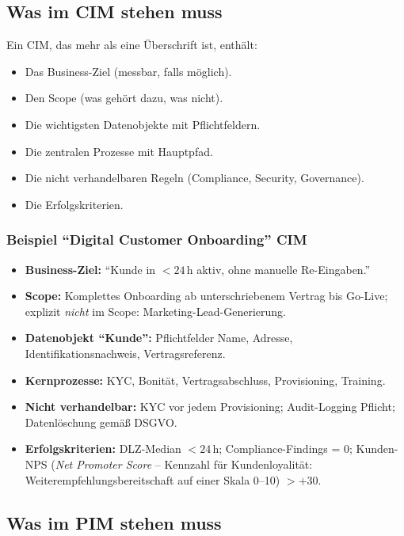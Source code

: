 \documentclass[11pt,a4paper,oneside]{article}
\begin{document}
\medskip

\subsection{Was im CIM stehen muss}

Ein CIM, das mehr als eine Überschrift ist, enthält:

\begin{itemize}
  \item Das Business-Ziel (messbar, falls möglich).
  \item Den Scope (was gehört dazu, was nicht).
  \item Die wichtigsten Datenobjekte mit Pflichtfeldern.
  \item Die zentralen Prozesse mit Hauptpfad.
  \item Die nicht verhandelbaren Regeln (Compliance, Security, Governance).
  \item Die Erfolgskriterien.
\end{itemize}

\subsubsection{Beispiel ``Digital Customer Onboarding'' CIM}

\begin{itemize}
  \item \textbf{Business-Ziel:} ``Kunde in $<24\,\text{h}$ aktiv, ohne manuelle Re-Eingaben.''
  \item \textbf{Scope:} Komplettes Onboarding ab unterschriebenem Vertrag bis Go-Live; explizit \emph{nicht} im Scope: Marketing-Lead-Generierung.
  \item \textbf{Datenobjekt ``Kunde'':} Pflichtfelder Name, Adresse, Identifikationsnachweis, Vertragsreferenz.
  \item \textbf{Kernprozesse:} KYC, Bonität, Vertragsabschluss, Provisioning, Training.
  \item \textbf{Nicht verhandelbar:} KYC vor jedem Provisioning; Audit-Logging Pflicht; Datenlöschung gemäß DSGVO.
  \item \textbf{Erfolgskriterien:} DLZ-Median $<24\,\text{h}$; Compliance-Findings = 0; Kunden-NPS (\emph{Net Promoter Score} -- Kennzahl für Kundenloyalität: Weiterempfehlungsbereitschaft auf einer Skala 0--10) $>+30$.
\end{itemize}

\subsection{Was im PIM stehen muss}
\end{document}
